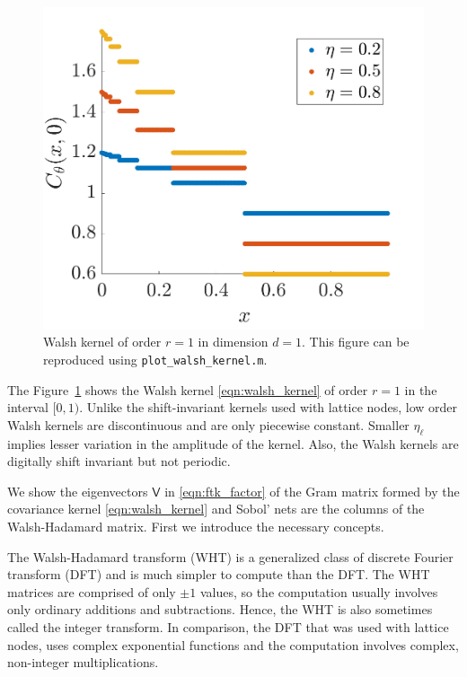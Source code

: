 \documentclass{iitthesis}          %
\newcommand{\mV}{\mathsf{V}}
\newcommand{\code}[1]{\texttt{#1}}
\newcommand\figref{Figure~\ref}
\newcommand{\JRNote}[1]{}
\begin{document}
\begin{figure}
	\centering
	\includegraphics[width=0.9\linewidth]{"figures/walsh_kernel dim_1"}
	\caption[Walsh kernel]{Walsh kernel of order $r=1$ in dimension $d=1$. This figure can be reproduced using \code{plot\_walsh\_kernel.m}. %
	}
	\label{fig:walshkernel-dim1}
\end{figure}

The \figref{fig:walshkernel-dim1} shows the Walsh kernel \eqref{eqn:walsh_kernel} of order $r=1$ in the interval $[0,1)$. Unlike the shift-invariant kernels used with lattice nodes, low order Walsh kernels are discontinuous and are only piecewise constant. Smaller $\eta_\ell$ implies lesser variation in the amplitude of the kernel. Also, the Walsh kernels are digitally shift invariant but not periodic.


We show the eigenvectors $\mV$ in \eqref{eqn:ftk_factor} of the Gram matrix formed by the covariance kernel \eqref{eqn:walsh_kernel} and Sobol' nets are the columns of the Walsh-Hadamard matrix. First we introduce the necessary concepts.

The Walsh-Hadamard transform (WHT) is a generalized class of discrete Fourier transform (DFT) and is much simpler to compute than the DFT. The WHT matrices are comprised of only $\pm 1$ values, so the computation usually involves only ordinary additions and subtractions. Hence, the WHT is also sometimes called the integer transform. In comparison, the DFT that was used with lattice nodes,  uses complex exponential functions and the computation involves complex, non-integer multiplications. 
\end{document}
